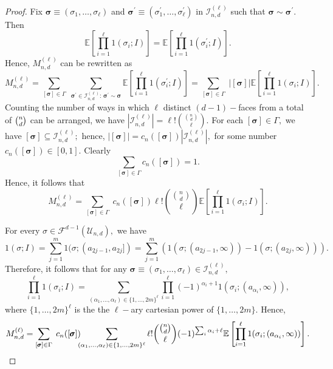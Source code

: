 \documentclass[12pt]{amsart}
\numberwithin{equation}{section}
\numberwithin{theorem}{section}
\newcommand{\1}{\mathbf{1}}
\def\F{\mathcal{F}}
\def\U{\mathcal{U}}
\def\sI{\mathscr{I}}
\begin{document}
\begin{proof}
Fix $\pmb{\sigma} \equiv (\sigma_1, \ldots, \sigma_{\ell})$ and $\pmb{\sigma^\prime} \equiv (\sigma^\prime_1,
\ldots, \sigma^{\prime}_{\ell})$ in $\sI_{n, d}^{(\ell)}$ such that $\pmb{\sigma} \sim \pmb{\sigma^\prime}.$ Then
\[
\mathbb{E}\left[\prod_{i = 1}^{\ell} 1(\sigma_i; I)\right] = \mathbb{E}\left[\prod_{i = 1}^{\ell} 1(\sigma^\prime_i; I)\right].
\]
%
Hence, $M_{n, d}^{(\ell)}$ can be rewritten as
\begin{equation*}
M_{n, d}^{(\ell)}  =  \sum_{[\pmb{\sigma}] \in \Gamma} \;  \sum_{\pmb{\sigma^\prime} \in \sI_{n, d}^{(\ell)} : \,
\pmb{\sigma^{\prime}} \sim \pmb{\sigma}} \mathbb{E}\left[\prod_{i = 1}^{\ell} 1(\sigma^\prime_i; I)\right]
=  \sum_{[\pmb{\sigma}] \in \Gamma} \; |[\pmb{\sigma}]| \mathbb{E}\left[\prod_{i = 1}^{\ell} 1(\sigma_i; I)\right].
\end{equation*}
%
Counting the number of ways in which $\ell$ distinct $(d - 1)-$faces from a total of $\tbinom{n}{d}$ can be arranged, we have $|\sI_{n, d}^{(\ell)}| = \ell ! \binom{\binom{n}{d}}{\ell}.$ For each $[\pmb{\sigma}] \in \Gamma,$ we have $[\pmb{\sigma}] \subseteq \sI_{n, d}^{(\ell)};$ hence, $|\pmb{[\sigma]}| = c_{n} ([\pmb{\sigma}]) |\sI_{n, d}^{(\ell)}|,$ for some number $c_{n}([\pmb{\sigma}]) \in [0,1].$ Clearly
\begin{equation}
\label{eqn:ConstantSum}
\sum_{[\pmb{\sigma}] \in \Gamma}c_{n}([\pmb{\sigma}]) = 1.
\end{equation}
%
Hence, it follows that
\[
M_{n, d}^{(\ell)} = \sum_{[\pmb{\sigma}] \in \Gamma} \; c_{n}([\pmb{\sigma}]) \ell ! \binom{\binom{n}{d}}{\ell}
\mathbb{E}\left[\prod_{i = 1}^{\ell} 1(\sigma_i; I)\right].
\]

For every $\sigma \in \F^{d - 1}(\U_{n, d}),$ we have
%
\begin{equation*}
1(\sigma; I) = \sum_{j = 1}^{m}1(\sigma; (a_{2j-1}, a_{2j}]) = \sum_{j = 1}^{m}( 1(\sigma; (a_{2j-1}, \infty)) - 1(\sigma; (a_{2j}, \infty))).
\end{equation*}
%
Therefore, it follows that for any $\pmb{\sigma} \equiv (\sigma_1, \ldots, \sigma_{\ell}) \in \sI_{n, d}^{(\ell)},$
\[
\prod_{i = 1}^{\ell} 1(\sigma_i; I) = \sum_{(\alpha_1, \ldots, \alpha_{\ell}) \in \{1, \ldots, 2m\}^\ell}  \prod_{i = 1}^{\ell} (-1)^{\alpha_i+1}1(\sigma_i; (a_{\alpha_i}, \infty)),
\]
%
where $\{1, \ldots, 2m\}^\ell$ is the the $\ell-$ary cartesian power of $\{1, \ldots, 2m\}.$ Hence,
\begin{equation}
\label{eqn:Mnd_SumForm}
M_{n, d}^{(\ell)} = \sum_{[\pmb{\sigma}] \in \Gamma} \; c_{n}([\pmb{\sigma}]) \hspace{-0.5em} \sum_{(\alpha_1, \ldots, \alpha_{\ell}) \in \{1, \ldots, 2m\}^\ell }  \ell ! \binom{\binom{n}{d}}{\ell}(-1)^{\sum_i\alpha_i+ \ell}
\mathbb{E}\left[\prod_{i = 1}^{\ell} 1(\sigma_i; (a_{\alpha_i}, \infty))\right].
\end{equation}


\end{proof}
\end{document}
